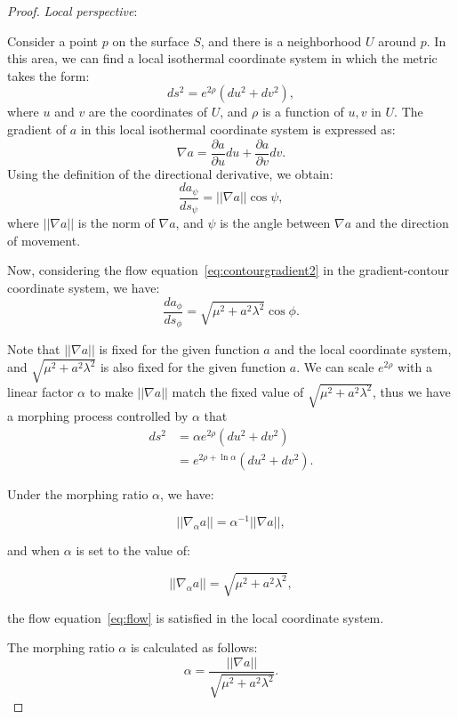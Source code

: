 \begin{proof}
    \emph{Local perspective}:

    Consider a point \( p \) on the surface \( S \), and there is a neighborhood \( U \) around \( p \).
    In this area, we can find a local isothermal coordinate system in which the metric takes the form:
    \[ ds^2 = e^{2\rho}(du^2 + dv^2), \]
    where \( u \) and \( v \) are the coordinates of \( U \), and \( \rho \) is a function of \( u, v \) in \( U \).
    The gradient of \( a \) in this local isothermal coordinate system is expressed as:
    \[ \nabla a = \frac{\partial a}{\partial u} du + \frac{\partial a}{\partial v} dv. \]
    Using the definition of the directional derivative, we obtain:
    \[ \frac{da_{\psi}}{ds_{\psi}} = ||\nabla a|| \cos \psi, \]
    where \( ||\nabla a|| \) is the norm of \( \nabla a \), and \( \psi \) is the angle between \( \nabla a \) and the direction of movement.

    Now, considering the flow equation~\ref{eq:contourgradient2} in the gradient-contour coordinate system, we have:
    \[ \frac{da_{\phi}}{ds_{\phi}} = \sqrt{\mu^2 + a^2 \lambda^2} \cos \phi. \]

    Note that \( ||\nabla a|| \) is fixed for the given function \( a \) and the local coordinate system, and \( \sqrt{\mu^2 + a^2 \lambda^2} \) is also fixed for the given function \( a \).
    We can scale \( e^{2\rho} \) with a linear factor \( \alpha \) to make \( ||\nabla a|| \) match the fixed value of \( \sqrt{\mu^2 + a^2 \lambda^2} \),
    thus we have a morphing process controlled by \( \alpha \) that
    \begin{align}
    ds^2 &= \alpha e^{2 \rho}(du^2 + dv^2)\label{eq:morphing} \\
         &= e^{2 \rho + \ln \alpha}(du^2 + dv^2).
    \end{align}

    Under the morphing ratio \( \alpha \), we have:

    \begin{equation}
      ||\nabla_\alpha a|| = \alpha^{-1} ||\nabla a||,
    \end{equation}

    and when \( \alpha \) is set to the value of:

    \[ ||\nabla_\alpha a|| = \sqrt{\mu^2 + a^2 \lambda^2}, \]

    the flow equation~\eqref{eq:flow} is satisfied in the local coordinate system.

    The morphing ratio \( \alpha \) is calculated as follows:
    \begin{equation}
        \alpha = \frac{||\nabla a||}{\sqrt{\mu^2 + a^2 \lambda^2}}\label{eq:ratio}.
    \end{equation}
    \qedhere
\end{proof}

